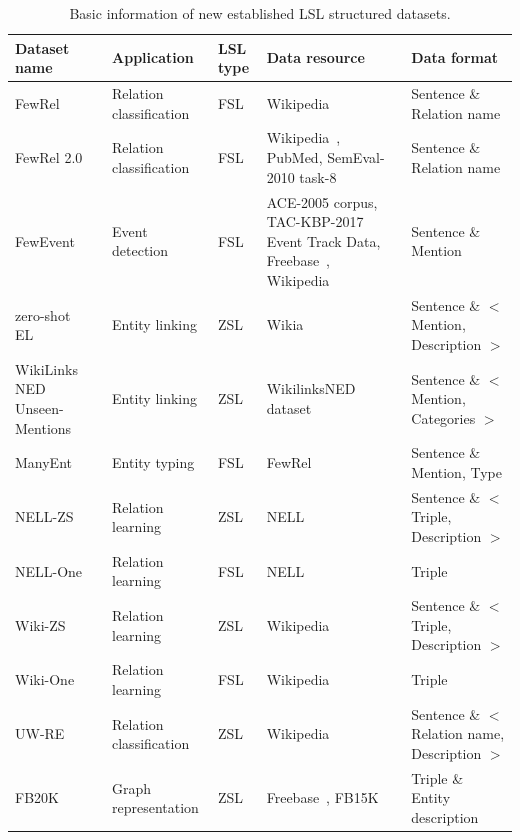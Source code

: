 \begin{table}[t]
\centering
\footnotesize
\caption{Basic information of new established LSL structured datasets.}
\label{tab5-2-1}
\begin{tabular}{p{58pt}|p{70pt}|p{30pt}|p{60pt}|p{122pt}}
\hline
Dataset name & Application & LSL type & Data resource & Data format \\
\hline
FewRel~ & Relation classification & FSL & Wikipedia~ & Sentence \& Relation name \\
\hline
FewRel 2.0~ & Relation classification & FSL & Wikipedia~, PubMed, SemEval-2010 task-8~ & Sentence \& Relation name \\
\hline
FewEvent~ & Event detection & FSL & ACE-2005 corpus, TAC-KBP-2017 Event Track Data, Freebase~, Wikipedia~ & Sentence \& Mention \\
\hline
zero-shot EL~ & Entity linking & ZSL & Wikia & Sentence \& $<$ Mention, Description $>$ \\
\hline
WikiLinks NED Unseen-Mentions~ & Entity linking & ZSL & WikilinksNED dataset~ & Sentence \& $<$ Mention, Categories $>$ \\
\hline
ManyEnt~ & Entity typing & FSL & FewRel~ & Sentence \& Mention, Type \\
\hline
NELL-ZS~ & Relation learning & ZSL & NELL~ & Sentence \& $<$ Triple, Description $>$ \\
\hline
NELL-One~ & Relation learning & FSL & NELL~ & Triple \\
\hline
Wiki-ZS~ & Relation learning & ZSL & Wikipedia~ & Sentence \& $<$ Triple, Description $>$ \\
\hline
Wiki-One~ & Relation learning & FSL & Wikipedia~ & Triple \\
\hline
UW-RE~ & Relation classification & ZSL & Wikipedia~ & Sentence \& $<$ Relation name, Description $>$ \\
\hline
FB20K~ & Graph representation & ZSL & Freebase~, FB15K~ & Triple \& Entity description \\
\hline
\end{tabular}
\end{table}
